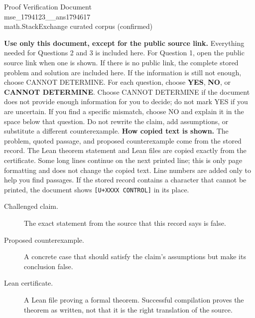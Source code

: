 \documentclass[11pt]{article}
\begin{document}
\begin{center}{\LARGE Proof Verification Document}\\[2pt]{\large mse\_1794123\_\_ans1794617}\\[2pt]{\small math.StackExchange curated corpus (confirmed)}\end{center}
\begin{center}\end{center}
\textbf{Use only this document, except for the public source link.} Everything needed for Questions 2 and 3 is included here. For Question 1, open the public source link when one is shown. If there is no public link, the complete stored problem and solution are included here. If the information is still not enough, choose CANNOT DETERMINE.
For each question, choose \textbf{YES}, \textbf{NO}, or \textbf{CANNOT DETERMINE}. Choose CANNOT DETERMINE if the document does not provide enough information for you to decide; do not mark YES if you are uncertain. If you find a specific mismatch, choose NO and explain it in the space below that question. Do not rewrite the claim, add assumptions, or substitute a different counterexample.
\textbf{How copied text is shown.} The problem, quoted passage, and proposed counterexample come from the stored record. The Lean theorem statement and Lean files are copied exactly from the certificate. Some long lines continue on the next printed line; this is only page formatting and does not change the copied text. Line numbers are added only to help you find passages. If the stored record contains a character that cannot be printed, the document shows \texttt{[U+XXXX CONTROL]} in its place.
\begin{description}
\item[Challenged claim.] The exact statement from the source that this record says is false.
\item[Proposed counterexample.] A concrete case that should satisfy the claim's assumptions but make its conclusion false.
\item[Lean certificate.] A Lean file proving a formal theorem. Successful compilation proves the theorem as written, not that it is the right translation of the source.
\end{description}
\end{document}
